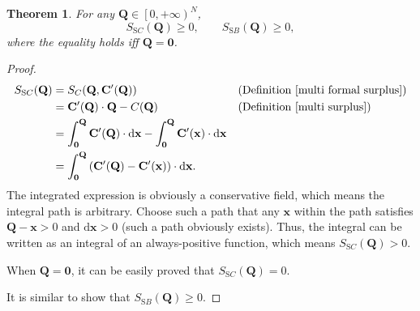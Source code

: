 \documentclass{article}
\newtheorem{theorem}{Theorem}[subsection]
\begin{document}
\begin{theorem}
For any $\mathbf Q\in\left[0,+\infty\right)^N$,
$$S_{\mathrm SC}\!\left(\mathbf Q\right)\ge0,
\qquad S_{\mathrm SB}\!\left(\mathbf Q\right)\ge0,$$
where the equality holds iff $\mathbf Q=\mathbf0$.
\end{theorem}
\begin{proof}
\begin{align*}
S_{\mathrm SC}\!\left(\mathbf Q\right)&=S_C\!\left(\mathbf Q,\mathbf C'\!\left(\mathbf Q\right)\right)&&\text{(Definition \ref{multi formal surplus})}\\
&=\mathbf C'\!\left(\mathbf Q\right)\cdot\mathbf Q-C\!\left(\mathbf Q\right)&&\text{(Definition \ref{multi surplus})}\\
&=\int_\mathbf0^\mathbf Q\mathbf C'\!\left(\mathbf Q\right)\cdot\mathrm d\mathbf x-\int_\mathbf0^\mathbf Q\mathbf C'\!\left(\mathbf x\right)\cdot\mathrm d\mathbf x\\
&=\int_\mathbf0^\mathbf Q\left(\mathbf C'\!\left(\mathbf Q\right)-\mathbf C'\!\left(\mathbf x\right)\right)\cdot\mathrm d\mathbf x.
\end{align*}
The integrated expression is obviously a conservative field, which means the integral path is arbitrary.
Choose such a path that any $\mathbf x$ within the path satisfies $\mathbf Q-\mathbf x>0$ and $\mathrm d\mathbf x>0$ (such a path obviously exists).
Thus, the integral can be written as an integral of an always-positive function, which means $S_{\mathrm SC}\!\left(\mathbf Q\right)>0$.

When $\mathbf Q=\mathbf0$, it can be easily proved that $S_{\mathrm SC}\!\left(\mathbf Q\right)=0$.

It is similar to show that $S_{\mathrm SB}\!\left(\mathbf Q\right)\ge0$.
\end{proof}
\end{document}
